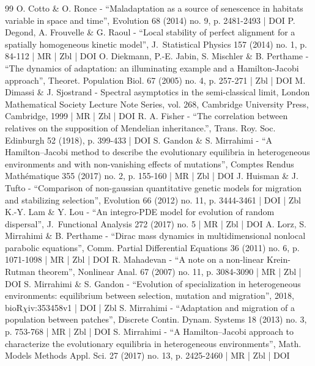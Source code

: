 \documentclass[10pt]{amsart}
\theoremstyle{plain}
\theoremstyle{definition}
\begin{document}
\begin{thebibliography}{99}
O. Cotto \& O. Ronce - “Maladaptation as a source of senescence in habitats variable in space and time”, Evolution 68 (2014) no. 9, p. 2481-2493 | DOI
P. Degond, A. Frouvelle \& G. Raoul - “Local stability of perfect alignment for a spatially homogeneous kinetic model”, J. Statistical Physics 157 (2014) no. 1, p. 84-112 | MR | Zbl | DOI
O. Diekmann, P.-E. Jabin, S. Mischler \& B. Perthame - “The dynamics of adaptation: an illuminating example and a Hamilton-Jacobi approach”, Theoret. Population Biol. 67 (2005) no. 4, p. 257-271 | Zbl | DOI
M. Dimassi \& J. Sjostrand - Spectral asymptotics in the semi-classical limit, London Mathematical Society Lecture Note Series, vol. 268, Cambridge University Press, Cambridge, 1999 | MR | Zbl | DOI
R. A. Fisher - “The correlation between relatives on the supposition of Mendelian inheritance.”, Trans. Roy. Soc. Edinburgh 52 (1918), p. 399-433 | DOI
S. Gandon \& S. Mirrahimi - “A Hamilton–Jacobi method to describe the evolutionary equilibria in heterogeneous environments and with non-vanishing effects of mutations”, Comptes Rendus Mathématique 355 (2017) no. 2, p. 155-160 | MR | Zbl | DOI
J. Huisman \& J. Tufto - “Comparison of non-gaussian quantitative genetic models for migration and stabilizing selection”, Evolution 66 (2012) no. 11, p. 3444-3461 | DOI | Zbl
K.-Y. Lam \& Y. Lou - “An integro-PDE model for evolution of random dispersal”, J. Functional Analysis 272 (2017) no. 5 | MR | Zbl | DOI
A. Lorz, S. Mirrahimi \& B. Perthame - “Dirac mass dynamics in multidimensional nonlocal parabolic equations”, Comm. Partial Differential Equations 36 (2011) no. 6, p. 1071-1098 | MR | Zbl | DOI
R. Mahadevan - “A note on a non-linear Krein-Rutman theorem”, Nonlinear Anal. 67 (2007) no. 11, p. 3084-3090 | MR | Zbl | DOI
S. Mirrahimi \& S. Gandon - “Evolution of specialization in heterogeneous environments: equilibrium between selection, mutation and migration”, 2018, bioR$\chi$iv:353458v1 | DOI | Zbl
S. Mirrahimi - “Adaptation and migration of a population between patches”, Discrete Contin. Dynam. Systems 18 (2013) no. 3, p. 753-768 | MR | Zbl | DOI
S. Mirrahimi - “A Hamilton–Jacobi approach to characterize the evolutionary equilibria in heterogeneous environments”, Math. Models Methods Appl. Sci. 27 (2017) no. 13, p. 2425-2460 | MR | Zbl | DOI

\end{thebibliography}
\end{document}
